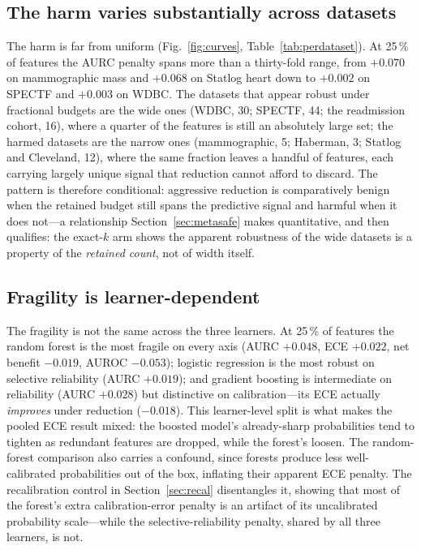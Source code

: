 \documentclass[fleqn,10pt]{wlscirep}
\newcommand{\result}[1]{#1}
\begin{document}
\subsection{The harm varies substantially across datasets}
The harm is far from uniform (Fig.~\ref{fig:curves}, Table~\ref{tab:perdataset}). At 25\,\% of
features the AURC penalty spans more than a thirty-fold range, from \result{$+0.070$} on mammographic mass and
\result{$+0.068$} on Statlog heart down to \result{$+0.002$} on SPECTF and \result{$+0.003$} on WDBC.
The datasets that appear robust under fractional budgets are the wide ones (WDBC, 30; SPECTF, 44; the
readmission cohort, 16), where a quarter of the features is still an absolutely large set; the harmed
datasets are the narrow ones (mammographic, 5; Haberman, 3; Statlog and Cleveland, 12), where the same
fraction leaves a handful of features, each carrying largely unique signal that reduction cannot
afford to discard. The pattern is therefore conditional: aggressive reduction is comparatively benign
when the retained budget still spans the predictive signal and harmful when it does not---a relationship
Section~\ref{sec:metasafe} makes quantitative, and then qualifies: the exact-$k$ arm shows the apparent
robustness of the wide datasets is a property of the \emph{retained count}, not of width itself.

\begin{table}[t]
\centering
\caption{Mean paired difference versus the full-feature model at 25\,\% of features, per dataset
(averaged over rankers and learners; positive ECE/Brier/AURC values indicate degradation, as do
negative AUROC values). Computed from the released per-configuration result summary.}
\label{tab:perdataset}

\end{table}

\subsection{Fragility is learner-dependent}
The fragility is not the same across the three learners. At 25\,\% of features the random forest is
the most fragile on every axis (AURC \result{$+0.048$}, ECE \result{$+0.022$}, net benefit
\result{$-0.019$}, AUROC \result{$-0.053$}); logistic regression is the most robust on selective
reliability (AURC \result{$+0.019$}); and gradient boosting is intermediate on reliability (AURC
\result{$+0.028$}) but distinctive on calibration---its ECE actually \emph{improves} under reduction
(\result{$-0.018$}). This learner-level split is what makes the pooled ECE result mixed: the boosted
model's already-sharp probabilities tend to tighten as redundant features are dropped, while the
forest's loosen. The random-forest comparison also carries a confound, since forests produce
less well-calibrated probabilities out of the box, inflating their apparent ECE penalty. The
recalibration control in Section~\ref{sec:recal} disentangles it, showing that most of the forest's
extra calibration-error penalty is an artifact of its uncalibrated probability scale---while the
selective-reliability penalty, shared by all three learners, is not.
\end{document}
